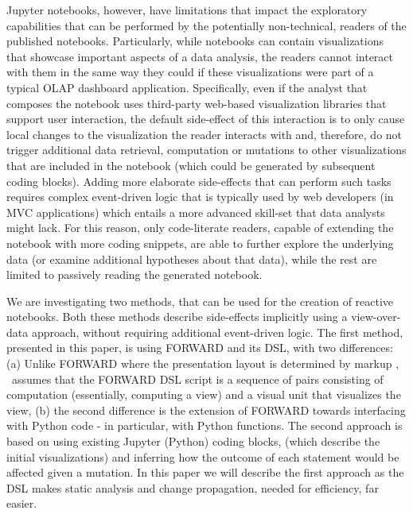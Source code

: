 Jupyter notebooks, however, have limitations that impact the exploratory capabilities that can be performed by the potentially non-technical, readers of the published notebooks. Particularly, while notebooks can contain visualizations that showcase important aspects of a data analysis, the readers cannot interact with them in the same way they could if these visualizations were part of a typical OLAP dashboard application. Specifically, even if the analyst that composes the notebook uses third-party web-based visualization libraries \cite{Bokeh, plotly, ipyvega, Altair} that support user interaction, the default side-effect of this interaction is to only cause local changes to the visualization the reader interacts with and, therefore, do not trigger additional data retrieval, computation or mutations to other visualizations that are included in the notebook (which could be generated by subsequent coding blocks). Adding more elaborate side-effects that can perform such tasks requires complex event-driven logic that is typically used by web developers (in MVC applications) which entails a more advanced skill-set that data analysts might lack. For this reason, only code-literate readers, capable of extending the notebook with more coding snippets, are able to further explore the underlying data (or examine additional hypotheses about that data), while the rest are limited to passively reading the generated notebook. 


We are investigating two methods, that can be used for the creation of reactive notebooks. Both these methods describe side-effects implicitly using a view-over-data approach, without requiring additional event-driven logic. The first method, presented in this paper, is using FORWARD  \cite{SIGMOD2010,CIDR2011} and its DSL, with two differences: (a) Unlike FORWARD where the presentation layout is determined by markup \cite{forward_online}, \projname\ assumes that the FORWARD DSL script is a sequence of pairs consisting of computation (essentially, computing a view) and a visual unit that visualizes the view, (b) the second difference is the extension of FORWARD towards interfacing with Python code - in particular, with Python functions. The second approach is based on using existing Jupyter (Python) coding blocks, (which describe the initial visualizations) and inferring how the outcome of each statement would be affected given a mutation. In this paper we will describe the first approach as the DSL makes static analysis and change propagation, needed for efficiency, far easier.

